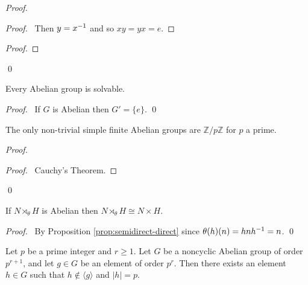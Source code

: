 \begin{proof}
\pf
{}
\begin{proof}
	\pf\ Then $y = {x}^{-1}$ and so $xy = yx = e$.
\end{proof}
\begin{proof}
\end{proof}
\qed
\end{proof}

\begin{prop}
Every Abelian group is solvable.
\end{prop}

\begin{proof}
\pf\ If $G$ is Abelian then $G' = \{e\}$. \qed
\end{proof}

\begin{prop}
The only non-trivial simple finite Abelian groups are $\mathbb{Z} / p \mathbb{Z}$ for $p$ a prime.
\end{prop}

\begin{proof}
\pf
{}
\begin{proof}
	\pf\ Cauchy's Theorem.
\end{proof}
\qed
\end{proof}

\begin{prop}
If $N \rtimes_\theta H$ is Abelian then $N \rtimes_\theta H \cong N \times H$.
\end{prop}

\begin{proof}
\pf\ By Proposition \ref{prop:semidirect-direct} since $\theta(h)(n) = hn{h}^{-1} = n$. \qed
\end{proof}

\begin{lm}
\label{lm:element-of-order-p}
Let $p$ be a prime integer and $r \geq 1$. Let $G$ be a noncyclic Abelian group of order $p^{r+1}$, and let $g \in G$ be an element of order $p^r$. Then there exists an element $h \in G$ such that $h \notin \langle g \rangle$ and $|h| = p$.
\end{lm}

